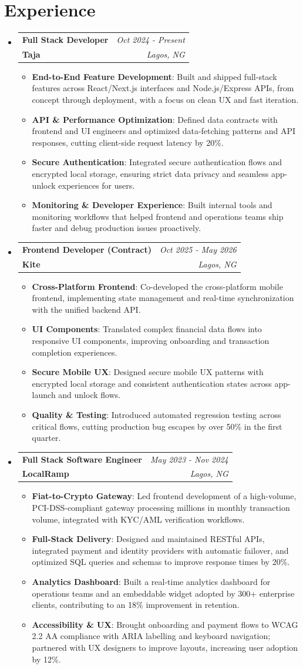 \documentclass[a4paper]{article}
\makeatletter
\newcommand{\resumeItem}[2]{ \item\small{ \textbf{#1}: #2 } }
\newcommand{\resumeJobHeading}[4]{ %
\vspace{2pt}
\item[]
\begin{tabular*}{0.97\textwidth}{l@{\extracolsep{\fill}}r}
	\textbf{#1} & \textit{#3} \\
	\textbf{#4} & \textit{#2} \\
\end{tabular*}
\vspace{0pt}
}
\newcommand{\resumeSubHeadingListStart}{\begin{itemize}[leftmargin=*,topsep=1pt]}
\newcommand{\resumeSubHeadingListEnd}{\end{itemize}}
\newcommand{\resumeItemListStart}{\begin{itemize}[topsep=0pt,itemsep=0pt,parsep=0pt]}
\newcommand{\resumeItemListEnd}{\end{itemize}}
\makeatother
\begin{document}
	\vspace{4pt}
	\section{Experience}
	\resumeSubHeadingListStart
	\resumeJobHeading{Full Stack Developer}{Lagos, NG}{Oct 2024 - Present}{Taja}
	\resumeItemListStart
	\resumeItem{End-to-End Feature Development}
	{Built and shipped full-stack features across React/Next.js interfaces and Node.js/Express APIs, from concept through deployment, with a focus on clean UX and fast iteration.}
	\resumeItem{API \& Performance Optimization}
	{Defined data contracts with frontend and UI engineers and optimized data-fetching patterns and API responses, cutting client-side request latency by 20\%.}
	\resumeItem{Secure Authentication}
	{Integrated secure authentication flows and encrypted local storage, ensuring strict data privacy and seamless app-unlock experiences for users.}
	\resumeItem{Monitoring \& Developer Experience}
	{Built internal tools and monitoring workflows that helped frontend and operations teams ship faster and debug production issues proactively.}
	\resumeItemListEnd

	\resumeJobHeading{Frontend Developer (Contract)}{Lagos, NG}{Oct 2025 - May 2026}{Kite}
	\resumeItemListStart
	\resumeItem{Cross-Platform Frontend}
	{Co-developed the cross-platform mobile frontend, implementing state management and real-time synchronization with the unified backend API.}
	\resumeItem{UI Components}
	{Translated complex financial data flows into responsive UI components, improving onboarding and transaction completion experiences.}
	\resumeItem{Secure Mobile UX}
	{Designed secure mobile UX patterns with encrypted local storage and consistent authentication states across app-launch and unlock flows.}
	\resumeItem{Quality \& Testing}
	{Introduced automated regression testing across critical flows, cutting production bug escapes by over 50\% in the first quarter.}
	\resumeItemListEnd

	\resumeJobHeading{Full Stack Software Engineer}{Lagos, NG}{May 2023 - Nov 2024}{LocalRamp}
	\resumeItemListStart
	\resumeItem{Fiat-to-Crypto Gateway}
	{Led frontend development of a high-volume, PCI-DSS-compliant gateway processing millions in monthly transaction volume, integrated with KYC/AML verification workflows.}
	\resumeItem{Full-Stack Delivery}
	{Designed and maintained RESTful APIs, integrated payment and identity providers with automatic failover, and optimized SQL queries and schemas to improve response times by 20\%.}
	\resumeItem{Analytics Dashboard}
	{Built a real-time analytics dashboard for operations teams and an embeddable widget adopted by 300+ enterprise clients, contributing to an 18\% improvement in retention.}
	\resumeItem{Accessibility \& UX}
	{Brought onboarding and payment flows to WCAG 2.2 AA compliance with ARIA labelling and keyboard navigation; partnered with UX designers to improve layouts, increasing user adoption by 12\%.}
	\resumeItemListEnd
	\resumeSubHeadingListEnd
\end{document}
